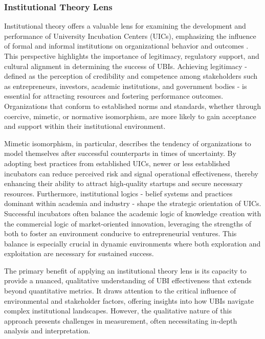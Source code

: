 \documentclass[../Main.tex]{subfiles}
\begin{document}
\subsubsection{Institutional Theory Lens}

Institutional theory offers a valuable lens for examining the development and performance of University Incubation Centers (UICs), emphasizing the influence of formal and informal institutions on organizational behavior and outcomes \autocite{Kulkarni2024University}. This perspective highlights the importance of legitimacy, regulatory support, and cultural alignment in determining the success of UBIs. Achieving legitimacy - defined as the perception of credibility and competence among stakeholders such as entrepreneurs, investors, academic institutions, and government bodies - is essential for attracting resources and fostering performance outcomes. Organizations that conform to established norms and standards, whether through coercive, mimetic, or normative isomorphism, are more likely to gain acceptance and support within their institutional environment.

Mimetic isomorphism, in particular, describes the tendency of organizations to model themselves after successful counterparts in times of uncertainty. By adopting best practices from established UICs, newer or less established incubators can reduce perceived risk and signal operational effectiveness, thereby enhancing their ability to attract high-quality startups and secure necessary resources. Furthermore, institutional logics - belief systems and practices dominant within academia and industry - shape the strategic orientation of UICs. Successful incubators often balance the academic logic of knowledge creation with the commercial logic of market-oriented innovation, leveraging the strengths of both to foster an environment conducive to entrepreneurial ventures. This balance is especially crucial in dynamic environments where both exploration and exploitation are necessary for sustained success.

The primary benefit of applying an institutional theory lens is its capacity to provide a nuanced, qualitative understanding of UBI effectiveness that extends beyond quantitative metrics. It draws attention to the critical influence of environmental and stakeholder factors, offering insights into how UBIs navigate complex institutional landscapes. However, the qualitative nature of this approach presents challenges in measurement, often necessitating in-depth analysis and interpretation.
\end{document}
